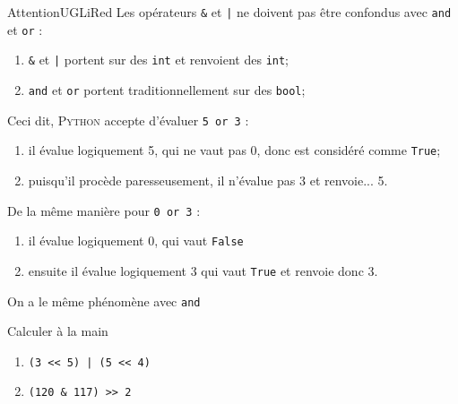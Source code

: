\documentclass[a4paper,10pt,cours,firamath]{nsi}
\begin{document}
\begin{encadrecolore}{Attention}{UGLiRed}
	Les opérateurs \texttt{&} et \texttt{|} ne doivent pas être confondus avec \texttt{and} et \texttt{or} :
	\begin{enumerate}
		\item 	\texttt{&} et \texttt{|} portent sur des \texttt{int} et renvoient des \texttt{int};
		\item 	\texttt{and} et \texttt{or} portent traditionnellement sur des \texttt{bool};
	\end{enumerate}
	Ceci dit, \textsc{Python} accepte d'évaluer \texttt{5 or 3} :
	\begin{enumerate}
		\item 	il évalue logiquement 5, qui ne vaut pas 0, donc est considéré comme \texttt{True};
		\item 	puisqu'il procède paresseusement, il n'évalue pas 3 et renvoie... 5.
	\end{enumerate}
	
	De la même manière pour \texttt{0 or 3} :
	\begin{enumerate}
		\item 	il évalue logiquement 0, qui vaut \texttt{False}
		\item 	ensuite il évalue logiquement 3 qui vaut \texttt{True} et renvoie donc 3.
	\end{enumerate}
	
	On a le même phénomène avec \texttt{and}
\end{encadrecolore}

\begin{exercice}[]
	Calculer à la main
	\begin{enumerate}
		\item 	\texttt{(3 << 5) | (5 << 4) }
		\item 	\texttt{(120 & 117) >> 2}
	\end{enumerate}
\end{exercice}
\end{document}
